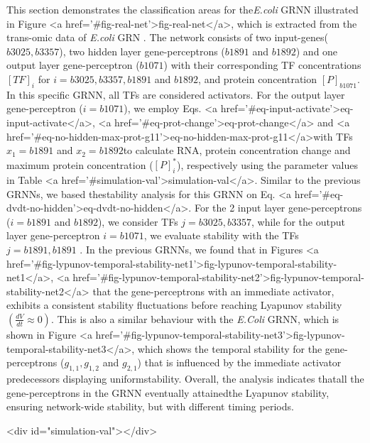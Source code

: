 \documentclass[twocolumn]{biophys-new}
\begin{document}
{{This section demonstrates the classification areas for the\emph{E.coli} GRNN illustrated in Figure <a href='#fig-real-net'>fig-real-net</a>, which is extracted from the trans-omic data of \emph{E.coli} GRN \cite{tierrafria2022regulondb}.
The network consists of two input-genes($b3025, b3357$), two hidden layer gene-perceptrons ($b1891$ and $b1892$) and one output layer gene-perceptron ($b1071$) with their corresponding TF concentrations $[TF]_{i}$ for $i=b3025, b3357, b1891$ and $b1892$, and protein concentration $[P]_{b1071}$. In this specific GRNN, all TFs are considered activators.
For the output layer gene-perceptron ($i=b1071$), we employ Eqs. <a href='#eq-input-activate'>eq-input-activate</a>, <a href='#eq-prot-change'>eq-prot-change</a> and <a href='#eq-no-hidden-max-prot-g11'>eq-no-hidden-max-prot-g11</a>with TFs$x_1=b1891$ and $x_2=b1892$to calculate RNA, protein concentration change and maximum protein concentration ($[P]^*_i$), respectively using the parameter values in Table <a href='#simulation-val'>simulation-val</a>.
Similar to the previous GRNNs, we based thestability analysis for this GRNN on Eq. <a href='#eq-dvdt-no-hidden'>eq-dvdt-no-hidden</a>. For the 2 input layer gene-perceptrons ($i=b1891$ and $b1892$), we consider TFs $j= b3025, b3357$, while for the output layer gene-perceptron $i=b1071$, we evaluate stability with the TFs $j= b1891, b1891$ . 
In the previous GRNNs, we found that in Figures <a href='#fig-lypunov-temporal-stability-net1'>fig-lypunov-temporal-stability-net1</a>, <a href='#fig-lypunov-temporal-stability-net2'>fig-lypunov-temporal-stability-net2</a> that the gene-perceptrons with an immediate activator, exhibits a consistent stability fluctuations before reaching Lyapunov stability $ \left( \frac{dV}{dt} \approx 0 \right)$. This is also a similar behaviour with the \emph{E.Coli} GRNN, which is shown in Figure <a href='#fig-lypunov-temporal-stability-net3'>fig-lypunov-temporal-stability-net3</a>, which shows the temporal stability for the gene-perceptrons ($g_{1,1}, g_{1,2}$ and $g_{2,1}$) that is influenced by the immediate activator predecessors displaying uniformstability. 
Overall, the analysis indicates thatall the gene-perceptrons in the GRNN eventually attainedthe Lyapunov stability, ensuring network-wide stability, but with different timing periods.

\begin{table}<div id="simulation-val"></div>


\end{table}}}
\end{document}
